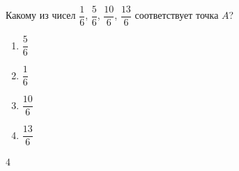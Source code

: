 \begin{ex}
	Какому из чисел $\dfrac{1}{6}$, $\dfrac{5}{6}$, $\dfrac{10}{6}$, $\dfrac{13}{6}$ соответствует точка $A$?
	
	\selectanswer
	\begin{multicols}{4}
		\begin{enumerate}[label=\arabic*)]
			\item $\dfrac{5}{6}$
			\item $\dfrac{1}{6}$
			\item $\dfrac{10}{6}$
			\item $\dfrac{13}{6}$
		\end{enumerate}
	\end{multicols}
	\begin{answer}
		4
	\end{answer}
\end{ex}